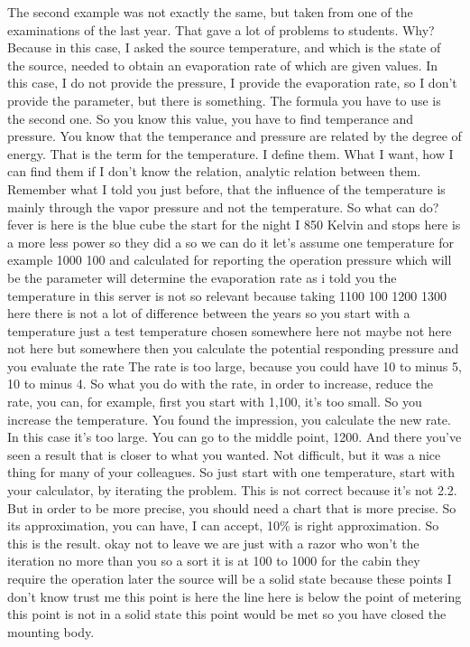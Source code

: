 The second example was not exactly the same, but taken from one of the examinations of the last year. That gave a lot of problems to students. Why? Because in this case, I asked the source temperature, and which is the state of the source, needed to obtain an evaporation rate of which are given values. In this case, I do not provide the pressure, I provide the evaporation rate, so I don't provide the parameter, but there is something. The formula you have to use is the second one. So you know this value, you have to find temperance and pressure. You know that the temperance and pressure are related by the degree of energy. That is the term for the temperature. I define them. What I want, how I can find them if I don't know the relation, analytic relation between them. Remember what I told you just before, that the influence of the temperature is mainly through the vapor pressure and not the temperature. So what can do? fever is here is the blue cube the start for the night I 850 Kelvin and stops here is a more less power so they did a so we can do it let's assume one temperature for example 1000 100 and calculated for reporting the operation pressure which will be the parameter will determine the evaporation rate as i told you the temperature in this server is not so relevant because taking 1100 100 1200 1300 here there is not a lot of difference between the years so you start with a temperature just a test temperature chosen somewhere here not maybe not here not here but somewhere then you calculate the potential responding pressure and you evaluate the rate The rate is too large, because you could have 10 to minus 5, 10 to minus 4. So what you do with the rate, in order to increase, reduce the rate, you can, for example, first you start with 1,100, it's too small. So you increase the temperature. You found the impression, you calculate the new rate. In this case it's too large. You can go to the middle point, 1200. And there you've seen a result that is closer to what you wanted. Not difficult, but it was a nice thing for many of your colleagues. So just start with one temperature, start with your calculator, by iterating the problem. This is not correct because it's not 2.2. But in order to be more precise, you should need a chart that is more precise. So its approximation, you can have, I can accept, 10\% is right approximation. So this is the result. okay not to leave we are just with a razor who won't the iteration no more than you so a sort it is at 100 to 1000 for the cabin they require the operation later the source will be a solid state because these points I don't know trust me this point is here the line here is below the point of metering this point is not in a solid state this point would be met so you have closed the mounting body.
